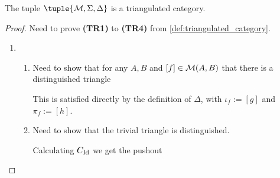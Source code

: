 \begin{example}
    \label{example:stable_module_category_triangulated}
    The tuple \( \tuple{\Mc, \Sigma, \Delta} \) is a triangulated category.
\end{example}
\begin{proof} %
    Need to prove {\bf (TR1)} to {\bf (TR4)} from \autoref{def:triangulated_category}.

    \begin{enumerate}[label={(\bfseries TR\arabic*)}]
        \item {
            \begin{enumerate}
                \item {
                    Need to show that for any \( A, B \) and \( [f] \in {\mathcal{M}}(A, B) \) that there is a distinguished triangle
                    \begin{center}
                    \end{center}

                    This is satisfied directly by the definition of \( \Delta \), with \( \iota_f := [g] \) and \( \pi_f := [h] \).
                }
                \item {
                    Need to show that the trivial triangle is distinguished.

                    Calculating \( C_{\operatorname{Id}} \) we get the pushout
                    \begin{center}
\end{center}}
\end{enumerate}}
\end{enumerate}
\end{proof}
